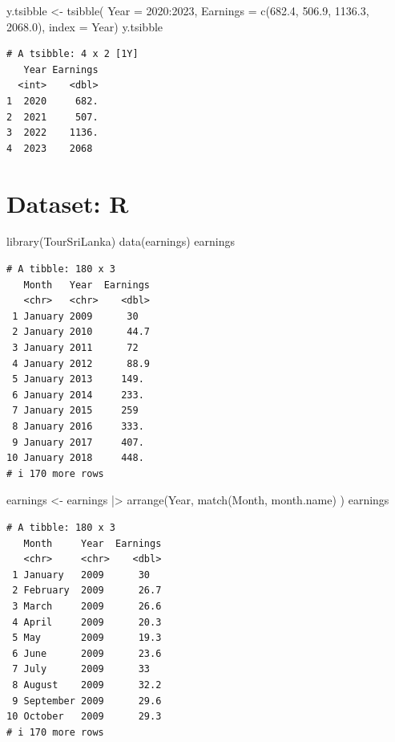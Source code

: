 \documentclass[
  11pt,
  a4paper,
]{report}
\newenvironment{Shaded}{\begin{snugshade}}{\end{snugshade}}
\newcommand{\AttributeTok}[1]{\textcolor[rgb]{0.40,0.45,0.13}{#1}}
\newcommand{\DecValTok}[1]{\textcolor[rgb]{0.68,0.00,0.00}{#1}}
\newcommand{\FloatTok}[1]{\textcolor[rgb]{0.68,0.00,0.00}{#1}}
\newcommand{\FunctionTok}[1]{\textcolor[rgb]{0.28,0.35,0.67}{#1}}
\newcommand{\NormalTok}[1]{\textcolor[rgb]{0.00,0.23,0.31}{#1}}
\newcommand{\OtherTok}[1]{\textcolor[rgb]{0.00,0.23,0.31}{#1}}
\newcommand{\SpecialCharTok}[1]{\textcolor[rgb]{0.37,0.37,0.37}{#1}}
\begin{document}
\begin{Shaded}
\begin{Highlighting}[]
\NormalTok{y.tsibble }\OtherTok{\textless{}{-}} \FunctionTok{tsibble}\NormalTok{(}
  \AttributeTok{Year =} \DecValTok{2020}\SpecialCharTok{:}\DecValTok{2023}\NormalTok{,}
  \AttributeTok{Earnings =} \FunctionTok{c}\NormalTok{(}\FloatTok{682.4}\NormalTok{, }\FloatTok{506.9}\NormalTok{, }\FloatTok{1136.3}\NormalTok{, }\FloatTok{2068.0}\NormalTok{),}
  \AttributeTok{index =}\NormalTok{ Year)}
\NormalTok{y.tsibble}
\end{Highlighting}
\end{Shaded}

\begin{verbatim}
# A tsibble: 4 x 2 [1Y]
   Year Earnings
  <int>    <dbl>
1  2020     682.
2  2021     507.
3  2022    1136.
4  2023    2068 
\end{verbatim}

\section{Dataset: R}\label{dataset-r}

\begin{Shaded}
\begin{Highlighting}[]
\FunctionTok{library}\NormalTok{(TourSriLanka)}
\FunctionTok{data}\NormalTok{(earnings)}
\NormalTok{earnings}
\end{Highlighting}
\end{Shaded}

\begin{verbatim}
# A tibble: 180 x 3
   Month   Year  Earnings
   <chr>   <chr>    <dbl>
 1 January 2009      30  
 2 January 2010      44.7
 3 January 2011      72  
 4 January 2012      88.9
 5 January 2013     149. 
 6 January 2014     233. 
 7 January 2015     259  
 8 January 2016     333. 
 9 January 2017     407. 
10 January 2018     448. 
# i 170 more rows
\end{verbatim}

\begin{Shaded}
\begin{Highlighting}[]
\NormalTok{earnings }\OtherTok{\textless{}{-}}\NormalTok{ earnings }\SpecialCharTok{|\textgreater{}}
  \FunctionTok{arrange}\NormalTok{(Year, }\FunctionTok{match}\NormalTok{(Month, month.name) )}
\NormalTok{earnings}
\end{Highlighting}
\end{Shaded}

\begin{verbatim}
# A tibble: 180 x 3
   Month     Year  Earnings
   <chr>     <chr>    <dbl>
 1 January   2009      30  
 2 February  2009      26.7
 3 March     2009      26.6
 4 April     2009      20.3
 5 May       2009      19.3
 6 June      2009      23.6
 7 July      2009      33  
 8 August    2009      32.2
 9 September 2009      29.6
10 October   2009      29.3
# i 170 more rows
\end{verbatim}
\end{document}
